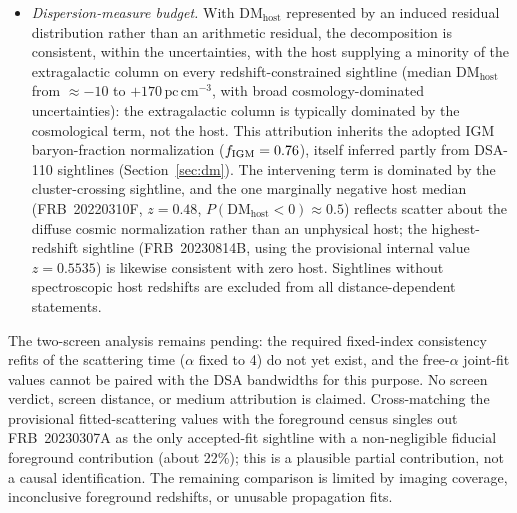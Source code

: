 \begin{itemize}
\item \textit{Dispersion-measure budget.} With $\mathrm{DM_{host}}$ represented by an
induced residual distribution rather than an arithmetic residual, the decomposition is consistent,
within the uncertainties, with the host supplying a minority of the
extragalactic column on every redshift-constrained sightline (median
$\mathrm{DM_{host}}$ from $\approx-10$ to $+170\,\mathrm{pc\,cm^{-3}}$, with
broad cosmology-dominated uncertainties): the extragalactic column is
typically dominated by the cosmological term, not the host. This attribution
inherits the adopted IGM baryon-fraction normalization
($f_{\rm IGM}=0.76$), itself inferred partly from DSA-110 sightlines
(Section~\ref{sec:dm}). The intervening term is dominated by the
cluster-crossing sightline, and the one marginally negative host median
(FRB~20220310F, $z=0.48$, $P(\mathrm{DM_{host}}<0)\approx0.5$) reflects
scatter about the diffuse cosmic
normalization rather than an unphysical host; the highest-redshift sightline
(FRB~20230814B, using the provisional internal value $z=0.5535$) is likewise
consistent with zero host.
Sightlines without spectroscopic
host redshifts are excluded from all distance-dependent statements.
\end{itemize}

The two-screen analysis remains pending: the required fixed-index
consistency refits of the scattering time ($\alpha$ fixed to 4) do not yet
exist, and
the free-$\alpha$ joint-fit values cannot be paired with the DSA bandwidths
for this purpose. No screen verdict,
screen distance, or medium attribution is claimed. Cross-matching the
provisional fitted-scattering values with the foreground census singles
out FRB~20230307A as the only accepted-fit sightline with a non-negligible
fiducial foreground contribution (about 22\%); this is a plausible partial
contribution, not a causal identification. The remaining comparison is limited
by imaging coverage, inconclusive foreground redshifts, or unusable propagation
fits.

%
